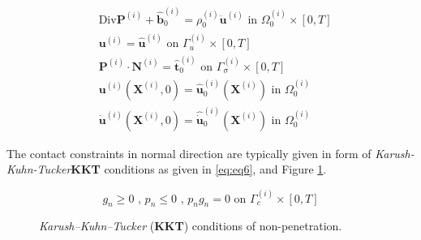 \documentclass[a4paper,10pt]{article} %
\begin{document}
\begin{subequations}\label{eq:eq0}
    \begin{align}
        & \text{Div} \mathbf{P}^{(i)}+\hat{\mathbf{b}}_0^{(i)}=\rho_0^{(i)}\ddot{\mathbf{u}}^{(i)} \text{ in } \Omega_0^{(i)} \times [0, T] \label{eq:subeq1}\\
        & \mathbf{u}^{(i)} = \hat{\mathbf{u}}^{(i)} \text{ on } \Gamma_u^{(i)} \times [0, T] \label{eq:subeq2}\\
        & \mathbf{P}^{(i)} \cdot \mathbf{N}^{(i)} = \hat{\mathbf{t}}_0^{(i)} \text{ on } \Gamma_\sigma^{(i)} \times [0, T] \label{eq:subeq3} \\
        & \mathbf{u}^{(i)}\left( \mathbf{X}^{(i)}, 0\right) = \hat{\mathbf{u}}_0^{(i)}\left( \mathbf{X}^{(i)}\right) \text{ in } \Omega_0^{(i)} \label{eq:subeq4} \\
        & \dot{\mathbf{u}}^{(i)}\left( \mathbf{X}^{(i)}, 0\right) = \hat{\dot{\mathbf{u}}}_0^{(i)}\left( \mathbf{X}^{(i)}\right) \text{ in } \Omega_0^{(i)} \label{eq:subeq5}
    \end{align}
\end{subequations}

The contact constraints in normal direction are typically given in form of \textit{Karush-Kuhn-Tucker}\textbf{KKT} conditions as given in \eqref{eq:eq6}, and Figure \ref{fig:kkt}.
 
\begin{equation}\label{eq:eq6}
    g_n \geq 0 \text{ , } p_n \leq 0 \text{ , } p_n g_n = 0 \text{ on } \Gamma_c^{(i)} \times [0, T]
\end{equation}

\begin{figure}[h]
    \begin{center}
        \caption{\textit{Karush–Kuhn–Tucker} (\textbf{KKT}) conditions of non-penetration.}
        \label{fig:kkt}
    \end{center}
\end{figure}
\end{document}
